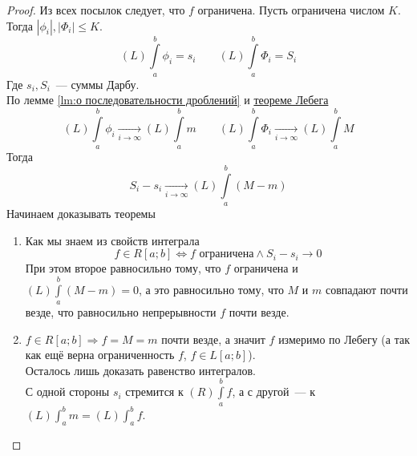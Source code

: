 \documentclass{article}
\begin{document}
    \begin{proof}
        Из всех посылок следует, что $f$ ограничена. Пусть ограничена числом $K$. Тогда $|\phi_i|,|\Phi_i|\leqslant K$.\\
        $$
        (L)\!\int\limits_a^b\phi_i=s_i\qquad (L)\!\int\limits_a^b\Phi_i=S_i
        $$
        Где $s_i,S_i$~--- суммы Дарбу.\\
        По лемме \ref{lm:о последовательности дроблений} и \hyperref[Теорема Лебега о мажорированной сходимости]{теореме Лебега}
        $$
        (L)\!\int\limits_a^b\phi_i\underset{i\to\infty}\longrightarrow(L)\!\int\limits_a^bm\qquad (L)\!\int\limits_a^b\Phi_i\underset{i\to\infty}\longrightarrow(L)\!\int\limits_a^bM
        $$
        Тогда
        $$
        S_i-s_i\underset{i\to\infty}\longrightarrow(L)\!\int\limits_a^b(M-m)
        $$
        Начинаем доказывать теоремы
        \begin{enumerate}
            \item Как мы знаем из свойств интеграла
            $$f\in R[a;b]\Leftrightarrow f\text{ ограничена}\land S_i-s_i\rightarrow0$$
            При этом второе равносильно тому, что $f$ ограничена и $(L)\!\int\limits_a^b(M-m)=0$, а это равносильно тому, что $M$ и $m$ совпадают почти везде, что равносильно непрерывности $f$ почти везде.
            \item $f\in R[a;b]\Rightarrow f=M=m$ почти везде, а значит $f$ измеримо по Лебегу (а так как ещё верна ограниченность $f$, $f\in L[a;b]$).\\
            Осталось лишь доказать равенство интегралов.\\
            С одной стороны $s_i$ стремится к $(R)\!\int\limits_a^bf$, а с другой~--- к $(L)\!\int_a^bm=(L)\!\int_a^bf$.
        \end{enumerate}
    \end{proof}
\end{document}
